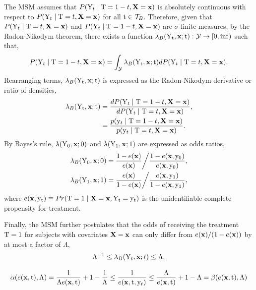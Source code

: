 The MSM assumes that $P(\mathrm{Y}_t \mid \mathrm{T} = 1-t, \mathbf{X}=\mathbf{x})$ is absolutely continuous with respect to $P(\mathrm{Y}_t \mid \mathrm{T} = t, \mathbf{X}=\mathbf{x})$ for all $\mathrm{t} \in \mathcal{T}_{B}$. Therefore, given that $P(\mathrm{Y}_t \mid \mathrm{T} = t, \mathbf{X}=\mathbf{x})$ and $P(\mathrm{Y}_t \mid \mathrm{T} = 1-t, \mathbf{X}=\mathbf{x})$ are $\sigma$-finite measures, by the Radon-Nikodym theorem, there exists a function $\lambda_{B}(\mathrm{Y}_{\mathrm{t}}, \mathbf{x}; \mathrm{t}): \mathcal{Y} \to [0, \inf)$ such that,
\begin{equation}
    P(\mathrm{Y}_t \mid \mathrm{T} = 1-t, \mathbf{X}=\mathbf{x}) = \int_{\mathcal{Y}} \lambda_{B}(\mathrm{Y}_{\mathrm{t}}, \mathbf{x}; \mathrm{t}) dP(\mathrm{Y}_t \mid \mathrm{T} = t, \mathbf{X}=\mathbf{x}).
\end{equation}
Rearranging terms, $\lambda_{B}(\mathrm{Y}_{\mathrm{t}}, \mathbf{x}; \mathrm{t})$ is expressed as the Radon-Nikodym derivative or ratio of densities,
\begin{equation}
    \begin{split}
        \lambda_{B}(\mathrm{Y}_{\mathrm{t}}, \mathbf{x}; \mathrm{t}) &= \frac{dP(\mathrm{Y}_t \mid \mathrm{T} = 1-t, \mathbf{X}=\mathbf{x})}{dP(\mathrm{Y}_t \mid \mathrm{T} = t, \mathbf{X}=\mathbf{x})}, \\
        &= \frac{p(\mathrm{y}_t \mid \mathrm{T} = 1-t, \mathbf{X}=\mathbf{x})}{p(\mathrm{y}_t \mid \mathrm{T} = t, \mathbf{X}=\mathbf{x})}.
    \end{split}
\end{equation}
By Bayes's rule, $\lambda(\mathrm{Y}_0, \mathbf{x}; 0)$ and $\lambda(\mathrm{Y}_1, \mathbf{x}; 1)$ are expressed as odds ratios,
\begin{equation}
    \begin{split}
        \lambda_{B}(\mathrm{Y}_0, \mathbf{x}; 0) &= \frac{1 - e(\mathbf{x})}{e(\mathbf{x})} \bigg/ \frac{1 - e(\mathbf{x}, \mathrm{y}_0)}{e(\mathbf{x}, \mathrm{y}_0)}, \\
        \lambda_{B}(\mathrm{Y}_1, \mathbf{x}; 1) &= \frac{e(\mathbf{x})}{1 - e(\mathbf{x})} \bigg/  \frac{e(\mathbf{x}, \mathrm{y}_1)}{1 - e(\mathbf{x}, \mathrm{y}_1)},
    \end{split}
\end{equation}
where $e(\mathbf{x}, \mathrm{y}_{\mathrm{t}}) \equiv Pr(\mathrm{T}=1 \mid \mathbf{X}=\mathbf{x}, \mathrm{Y}_{\mathrm{t}}=\mathrm{y}_{\mathrm{t}})$ is the unidentifiable complete propensity for treatment.

Finally, the MSM further postulates that the odds of receiving the treatment $\mathrm{T}=1$ for subjects with covariates $\mathbf{X}=\mathbf{x}$ can only differ from $e(\mathbf{x}) / (1 - e(\mathbf{x}))$ by at most a factor of $\Lambda$,
\begin{equation}
    \Lambda^{-1} \leq \lambda_{B}(\mathrm{Y}_t, \mathbf{x}; t) \leq \Lambda.
\end{equation}

\begin{equation}
    \alpha(e(\mathbf{x}, \mathrm{t}), \Lambda) = \frac{1}{\Lambda e(\mathbf{x}, \mathrm{t})} + 1 - \frac{1}{\Lambda} \leq \frac{1}{e(\mathbf{x}, \mathrm{t}, \mathrm{y}_t)} \leq \frac{\Lambda}{e(\mathbf{x}, \mathrm{t})} + 1 - \Lambda = \beta(e(\mathbf{x}, \mathrm{t}), \Lambda)
\end{equation}

